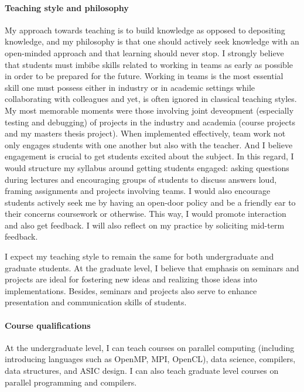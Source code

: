 \paragraph{Teaching style and philosophy}
My approach towards teaching is to build knowledge as opposed to depositing knowledge, and my philosophy is that one should actively seek knowledge with an open-minded approach and that learning should never stop.  
I strongly believe that students must imbibe skills related to working in teams as early as possible in order to be prepared for the future.
Working in teams is the most essential skill one must possess either in industry or in academic settings while collaborating with colleagues and yet, is often ignored in classical teaching styles.
My most memorable moments were those involving joint deveopment (especially testing and debugging) of projects in the industry and academia (course projects and my masters thesis project).
When implemented effectively, team work not only engages students with one another but also with the teacher. 
And I believe engagement is crucial to get students excited about the subject.
In this regard, I would structure my syllabus around getting students engaged: asking questions during lectures and encouraging groups of students to discuss answers loud, framing assignments and projects involving teams.
I would also encourage students actively seek me by having an open-door policy and be a friendly ear to their concerns coursework or otherwise. 
This way, I would promote interaction and also get feedback.
I will also reflect on my practice by soliciting mid-term feedback.

I expect my teaching style to remain the same for both undergraduate and graduate students. 
At the graduate level, I believe that emphasis on seminars and projects are ideal for fostering new ideas and realizing those ideas into implementations.
Besides, seminars and projects also serve to enhance presentation and communication skills of students.


\paragraph{Course qualifications}
At the undergraduate level, I can teach courses on parallel computing (including introducing languages such as OpenMP, MPI, OpenCL), data science, compilers, data structures, and ASIC design.
I can also teach graduate level courses on parallel programming and compilers.  







